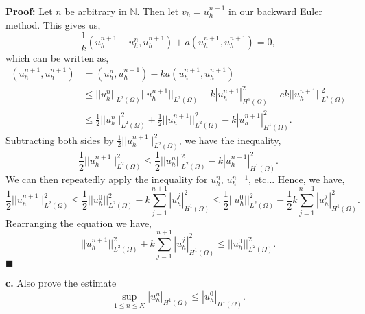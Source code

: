 \documentclass[11pt]{article}
\begin{document}
\textbf{Proof:} Let $n$ be arbitrary in $\mathbb{N}$. 
Then let $v_h = u^{n+1}_h$ in our backward Euler method.
This gives us,
\begin{equation*}
    \frac{1}{k}(u^{n+1}_h - u^n_h, u^{n+1}_h) + a(u_h^{n+1}, u_h^{n+1}) = 0,
\end{equation*}
which can be written as,
\begin{align*}
    (u_h^{n+1}, u_h^{n+1}) &= (u_h^n, u^{n+1}_h) - ka(u_h^{n+1}, u_h^{n+1}) \\
    &\leq ||u^n_h||_{L^2(\Omega)} ||u^{n+1}_h||_{L^2(\Omega)} - k|u^{n+1}_h|^2_{H^1(\Omega)} - ck||u^{n+1}_h||^2_{L^2(\Omega)} \\
    &\leq \frac{1}{2}||u^n_h||^2_{L^2(\Omega)} + \frac{1}{2} ||u^{n+1}_h||^2_{L^2(\Omega)} - k|u^{n+1}_h|^2_{H^1(\Omega)}.
\end{align*}
Subtracting both sides by $\frac{1}{2}||u^{n+1}_h||^2_{L^2(\Omega)}$, we have the inequality,
\begin{equation*}
    \frac{1}{2} ||u^{n+1}_h||^2_{L^2(\Omega)} \leq \frac{1}{2} ||u^n_h||^2_{L^2(\Omega)} - k|u^{n+1}_h|^2_{H^1(\Omega)}.
\end{equation*}
We can then repeatedly apply the inequality for $u^n_h$, $u^{n-1}_h$, etc...
Hence, we have,
\begin{equation*}
    \frac{1}{2}||u_h^{n+1}||^2_{L^2(\Omega)} \leq \frac{1}{2} ||u^0_h||^2_{L^2(\Omega)} - k\sum_{j=1}^{n+1} |u^j_h|^2_{H^1(\Omega)} \leq \frac{1}{2} ||u^0_h||^2_{L^2(\Omega)} - \frac{1}{2} k\sum_{j=1}^{n+1} |u^j_h|^2_{H^1(\Omega)}.
\end{equation*}
Rearranging the equation we have,
\begin{equation*}
    ||u^{n+1}_h||^2_{L^2(\Omega)} + k\sum_{j=1}^{n+1} |u_h^j|^2_{H^1(\Omega)} \leq ||u_h^0||^2_{L^2(\Omega)}.
\end{equation*}
$\blacksquare$



\vskip 2cm


\textbf{c.} Also prove the estimate 
\begin{equation}
    \sup_{1 \leq n \leq K} |u^n_h|_{H^1(\Omega)} \leq |u^0_h|_{H^1(\Omega)}.
\end{equation}

\vskip 1cm
\end{document}
